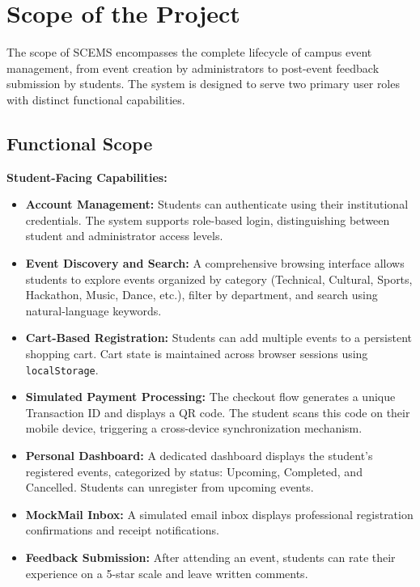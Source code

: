\documentclass[12pt,a4paper]{report}
\begin{document}
\section{Scope of the Project}

The scope of SCEMS encompasses the complete lifecycle of campus event management, from event creation by administrators to post-event feedback submission by students. The system is designed to serve two primary user roles with distinct functional capabilities.

\subsection{Functional Scope}

\textbf{Student-Facing Capabilities:}
\begin{itemize}
    \item \textbf{Account Management:} Students can authenticate using their institutional credentials. The system supports role-based login, distinguishing between student and administrator access levels.
    \item \textbf{Event Discovery and Search:} A comprehensive browsing interface allows students to explore events organized by category (Technical, Cultural, Sports, Hackathon, Music, Dance, etc.), filter by department, and search using natural-language keywords.
    \item \textbf{Cart-Based Registration:} Students can add multiple events to a persistent shopping cart. Cart state is maintained across browser sessions using \texttt{localStorage}.
    \item \textbf{Simulated Payment Processing:} The checkout flow generates a unique Transaction ID and displays a QR code. The student scans this code on their mobile device, triggering a cross-device synchronization mechanism.
    \item \textbf{Personal Dashboard:} A dedicated dashboard displays the student's registered events, categorized by status: Upcoming, Completed, and Cancelled. Students can unregister from upcoming events.
    \item \textbf{MockMail Inbox:} A simulated email inbox displays professional registration confirmations and receipt notifications.
    \item \textbf{Feedback Submission:} After attending an event, students can rate their experience on a 5-star scale and leave written comments.
\end{itemize}
\end{document}
